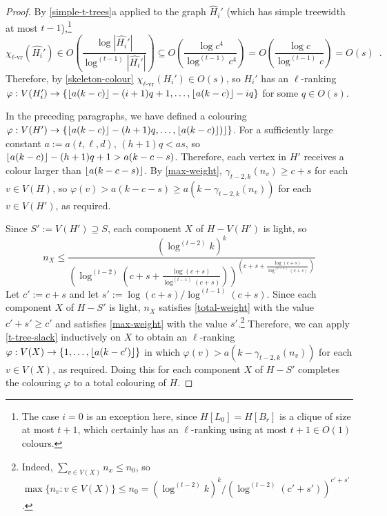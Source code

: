 \documentclass[kpfonts]{patmorin}
\newcommand{\rn}[1]{\chi_{\operatorname{#1-vr}}}
\newcommand{\lrn}{\rn{\ell}}
\theoremstyle{named}
\newcommand{\weirdref}[2]{\cref{#1}#2}
\begin{document}
\begin{proof}
    By \weirdref{simple-t-trees}{a} applied to the graph $\hat{H}_i'$ (which has simple treewidth at most $t-1$),\footnote{The case $i=0$ is an exception here, since $H[L_0]=H[B_r]$ is a clique of size at most $t+1$, which certainly has an $\ell$-ranking using at most $t+1\in O(1)$ colours.}
    \[
       \lrn(\hat{H_i}')\in
       O\left(\frac{\log|\hat{H_i}'|}{\log^{(t-1)}|\hat{H_i}'|}\right)
       \subseteq O\left(\frac{\log c^4}{\log^{(t-1)} c^4}\right)
       = O\left(\frac{\log c}{\log^{(t-1)} c}\right)
       = O(s) \enspace .
    \]
    Therefore, by \cref{skeleton-colour} $\lrn(H_i')\in O(s)$, so
    $H_i'$ has an $\ell$-ranking $\varphi:V(H_i')\to \{{\lfloor a(k-c) \rfloor}-(i+1)q+1,\ldots,\lfloor a(k-c)\rfloor-iq\}$ for some $q\in O(s)$.

    In the preceding paragraphs, we have defined a colouring $\varphi: V(H')\to \{{\lfloor a(k-c) \rfloor}-(h+1)q,\ldots,{\lfloor a(k-c) \rfloor})\rfloor\}$. For a sufficiently large constant $a:=a(t,\ell,d)$, $(h+1)q < as$, so ${\lfloor a(k-c) \rfloor}-(h+1)q+1 > a(k-c-s)$. Therefore, each vertex in $H'$ receives a colour larger than ${\lfloor a(k-c-s) \rfloor}$. By \cref{max-weight}, $\gamma_{t-2,k}(n_v)\ge c+s$ for each $v\in V(H)$, so $\varphi(v)>a(k-c-s) \ge a(k-\gamma_{t-2,k}(n_v))$ for each $v\in V(H')$, as required.

    Since $S':=V(H')\supseteq S$, each component $X$ of $H-V(H')$ is light, so
    \[
       n_{X} \le \frac{(\log^{(t-2)} k)^k}{
        \left(
            \log^{(t-2)}
                \left(
                   c+s+\tfrac{\log(c+s)}{\log^{(t-1)}(c+s)}
               \right)
        \right)^{\left(
           c+s+\tfrac{\log(c+s)}{\log^{(t-1)}(c+s)}
       \right)}
       }
   \]
   Let $c':=c+s$ and let $s':=\log (c+s)/\log^{(t-1)}(c+s)$.  Since each component $X$ of $H-S'$ is light, $n_X$ satisfies \cref{total-weight} with the value $c'+s'\ge c'$ and satisfies \cref{max-weight} with the value $s'$.\footnote{Indeed, $\sum_{v\in V(X)} n_x\le n_0$, so $\max\{n_v:v\in V(X)\}\le n_0= (\log^{(t-2)} k)^k/(\log^{(t-2)}(c'+s'))^{c'+s'}$.}  Therefore, we can apply \cref{t-tree-slack} inductively on $X$ to obtain an $\ell$-ranking $\varphi:V(X)\to\{1,\ldots,{\lfloor a(k-c') \rfloor}\}$ in which $\varphi(v)> a(k-\gamma_{t-2,k}(n_v))$ for each $v\in V(X)$, as required.   Doing this for each component $X$ of $H-S'$ completes the colouring $\varphi$ to a total colouring of $H$.


\end{proof}
\end{document}
